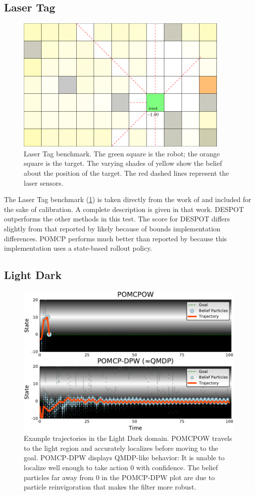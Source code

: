 \subsection{Laser Tag}

\begin{figure}[htpb]
    \centering
    \includegraphics[width=0.6\linewidth]{media/lasertag.png}
    \caption[Laser Tag benchmark]{Laser Tag benchmark. The green square is the robot; the orange square is the target. The varying shades of yellow show the belief about the position of the target. The red dashed lines represent the laser sensors.}
    \label{fig:lasertag}
\end{figure}

The Laser Tag benchmark (\cref{fig:lasertag}) is taken directly from the work of \citet{somani2013despot} and included for the sake of calibration. A complete description is given in that work. DESPOT outperforms the other methods in this test. The score for DESPOT differs slightly from that reported by \citet{somani2013despot} likely because of bounds implementation differences.
POMCP performs much better than reported by \citet{somani2013despot} because this implementation uses a state-based rollout policy.

\subsection{Light Dark}

\begin{figure}[htb]
    \centering
    \includegraphics[width=0.6\columnwidth]{media/ld_fig.pdf}
    \caption[Light Dark problem]{Example trajectories in the Light Dark domain. POMCPOW travels to the light region and accurately localizes before moving to the goal. POMCP-DPW displays QMDP-like behavior: It is unable to localize well enough to take action \num{0} with confidence. The belief particles far away from \num{0} in the POMCP-DPW plot are due to particle reinvigoration that makes the filter more robust.}
    \label{fig:ld}
\end{figure}

